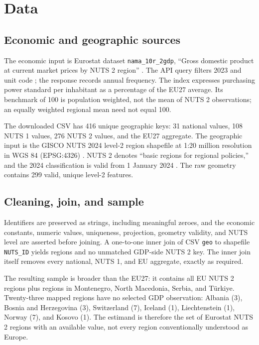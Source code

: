 \documentclass[11pt,a4paper]{article}
\begin{document}
\section{Data}

\subsection{Economic and geographic sources}

The economic input is Eurostat dataset \texttt{nama\_10r\_2gdp}, ``Gross
domestic product at current market prices by NUTS 2 region''
\citep{eurostat2026gdp}. The API query filters 2023 and unit code
; the response records annual frequency. The index
expresses purchasing power standard per inhabitant as a percentage of the EU27
average. Its benchmark of 100 is population weighted, not the mean of NUTS 2
observations; an equally weighted regional mean need not equal 100.

The downloaded CSV has 416 unique geographic keys: 31 national values, 108
NUTS 1 values, 276 NUTS 2 values, and the EU27 aggregate. The geographic input
is the GISCO NUTS 2024 level-2 region shapefile at 1:20 million resolution in
WGS 84 (EPSG:4326) \citep{gisco2026}. NUTS 2 denotes ``basic regions for
regional policies,'' and the 2024 classification is valid from 1 January 2024
\citep{eurostat2026nuts}. The raw geometry contains 299 valid, unique level-2
features.

\subsection{Cleaning, join, and sample}

Identifiers are preserved as strings, including meaningful zeroes, and the
economic constants, numeric values, uniqueness, projection, geometry validity,
and NUTS level are asserted before joining. A one-to-one inner join of CSV
\texttt{geo} to shapefile \texttt{NUTS\_ID} yields \NRegions{} regions and no
unmatched GDP-side NUTS 2 key. The inner join itself removes every national,
NUTS 1, and EU aggregate, exactly as required.

The resulting sample is broader than the EU27: it contains all \NEURegions{}
EU NUTS 2 regions plus \NCandidateRegions{} regions in Montenegro, North
Macedonia, Serbia, and Türkiye. Twenty-three mapped regions have no selected
GDP observation: Albania (3), Bosnia and Herzegovina (3), Switzerland (7),
Iceland (1), Liechtenstein (1), Norway (7), and Kosovo (1). The estimand is
therefore the set of Eurostat NUTS 2 regions with an available value, not every
region conventionally understood as Europe.
\end{document}
